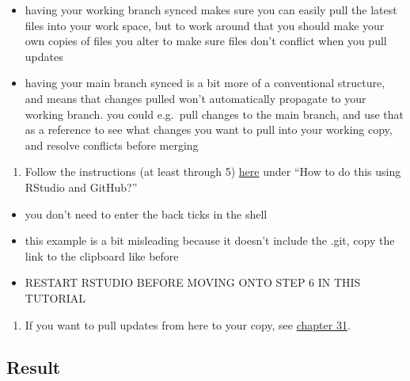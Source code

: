 \documentclass[
]{book}
\providecommand{\tightlist}{%
  \setlength{\itemsep}{0pt}\setlength{\parskip}{0pt}}
\begin{document}
\begin{itemize}
\tightlist
\item
  having your working branch synced makes sure you can easily pull the latest files into your work space, but to work around that you should make your own copies of files you alter to make sure files don't conflict when you pull updates\\
\item
  having your main branch synced is a bit more of a conventional structure, and means that changes pulled won't automatically propagate to your working branch. you could e.g.~pull changes to the main branch, and use that as a reference to see what changes you want to pull into your working copy, and resolve conflicts before merging\\
\end{itemize}

\begin{enumerate}
\def\labelenumi{\arabic{enumi}.}
\setcounter{enumi}{3}
\tightlist
\item
  Follow the instructions (at least through 5) \href{https://r-bio.github.io/intro-git-rstudio/}{here} under ``How to do this using RStudio and GitHub?''\\
\end{enumerate}

\begin{itemize}
\tightlist
\item
  you don't need to enter the back ticks in the shell\\
\item
  this example is a bit misleading because it doesn't include the .git, copy the link to the clipboard like before\\
\item
  RESTART RSTUDIO BEFORE MOVING ONTO STEP 6 IN THIS TUTORIAL\\
\end{itemize}

\begin{enumerate}
\def\labelenumi{\arabic{enumi}.}
\setcounter{enumi}{4}
\tightlist
\item
  If you want to pull updates from here to your copy, see \href{https://happygitwithr.com/upstream-changes.html\#pull-changes-from-upstream}{chapter 31}.
\end{enumerate}

\hypertarget{result}{%
\subsection*{Result}\label{result}}
\end{document}
